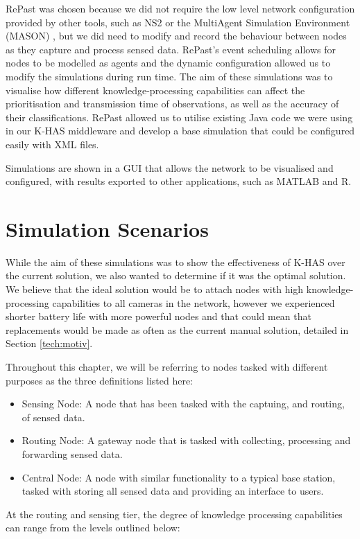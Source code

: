 RePast was chosen because we did not require the low level network configuration provided by other tools, such as NS2 \cite{mccanne1997network} or the MultiAgent Simulation Environment (MASON) \cite{mason}, but we did need to modify and record the behaviour between nodes as they capture and process sensed data. RePast's event scheduling allows for nodes to be modelled as agents and the dynamic configuration allowed us to modify the simulations during run time. The aim of these simulations was to visualise how different knowledge-processing capabilities can affect the prioritisation and transmission time of observations, as well as the accuracy of their classifications. RePast allowed us to utilise existing Java code we were using in our K-HAS middleware and develop a base simulation that could be configured easily with XML files.

Simulations are shown in a GUI that allows the network to be visualised and configured, with results exported to other applications, such as MATLAB and R.

\section{Simulation Scenarios}\label{sim:scen}
While the aim of these simulations was to show the effectiveness of K-HAS over the current solution, we also wanted to determine if it was the optimal solution. We believe that the ideal solution would be to attach nodes with high knowledge-processing capabilities to all cameras in the network, however we experienced shorter battery life with more powerful nodes and that could mean that replacements would be made as often as the current manual solution, detailed in Section \ref{tech:motiv}.

Throughout this chapter, we will be referring to nodes tasked with different purposes as the three definitions listed here:
	\begin{itemize}
		\item Sensing Node: A node that has been tasked with the captuing, and routing, of sensed data.
		\item Routing Node: A gateway node that is tasked with collecting, processing and forwarding sensed data.
		\item Central Node: A node with similar functionality to a typical base station, tasked with storing all sensed data and providing an interface to users.
	\end{itemize}

At the routing and sensing tier, the degree of knowledge processing capabilities can range from the levels outlined below:

